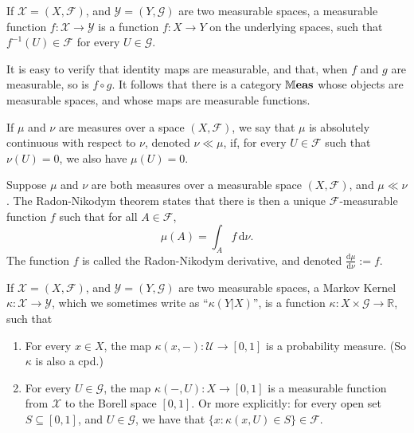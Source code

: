 \begin{defn}
    If $\mathcal X  = (X, \mathcal F)$, and $\mathcal Y = (Y, \mathcal G)$ are two measurable spaces, a measurable function $f : \mathcal X \to \mathcal Y$ is a function $f: X \to Y$ on the underlying spaces, such that 
    $f^{-1}(U) \in \mathcal F$ for every $U \in \mathcal G$.
\end{defn}

It is easy to verify that identity maps are measurable, and that, when $f$ and $g$ are measurable, so is $f \circ g$. 
It follows that there is a category $\mathbb{M}\mathbf{eas}$ whose objects are measurable spaces, and whose maps are measurable functions. 


\begin{defn}
    If $\mu$ and $\nu$ are measures over a space $(X, \mathcal F)$, 
    we say that $\mu$ is absolutely continuous with respect to $\nu$, denoted $\nu \ll \mu$, if, for every $U \in \mathcal F$ such that $\nu(U) = 0$, we also have $\mu(U) = 0$. 
\end{defn}

\begin{defn}
    Suppose $\mu$ and $\nu$ are both measures over a measurable space $(X,\mathcal F)$, and $\mu \ll \nu$. 
    The Radon-Nikodym theorem states that there is then a unique $\mathcal F$-measurable function $f$
    such that for all $A \in \mathcal F$,
    \[
        \mu(A) = \int_{A} f \,\mathrm d \nu.
    \]
    The function $f$ is called the Radon-Nikodym derivative, and
    denoted $\frac{\mathrm d\mu}{\mathrm d\nu} := f$.
\end{defn}

\begin{defn}
    If $\mathcal X  = (X, \mathcal F)$, and $\mathcal Y = (Y, \mathcal G)$ are two measurable spaces, a Markov Kernel $\kappa : \mathcal X \to \mathcal Y$, which we sometimes write as ``$\kappa(Y|X)$'', is a function $\kappa : X \times \mathcal G \to \mathbb R$, such that
    \begin{enumerate}
        \item For every $x \in X$, the map $\kappa(x, -) : \mathcal U \to [0,1]$ is a probability measure. (So $\kappa$ is also a cpd.)
        \item For every $U \in \mathcal G$, the map $\kappa(-, U) : X \to [0,1]$ is a measurable function from $\mathcal X$ to the Borell space $[0,1]$.
        Or more explicitly: for every open set $S \subseteq [0,1]$, and $U \in \mathcal G$, we have that
        $\{x : \kappa(x,U) \in S\} \in \mathcal F$. 
\end{enumerate}
\end{defn}

